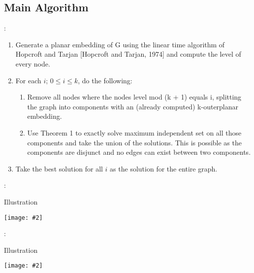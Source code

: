 \documentclass{beamer}
\newcommand{\iph}[2]{
    \texttt{[image: \#2]}
}
\begin{document}
\subsection{Main Algorithm}
\begin{frame}{\secname : \subsecname}
    \begin{enumerate}
        \item Generate a planar embedding of G using the linear time algorithm of Hopcroft and Tarjan [Hopcroft
        and Tarjan, 1974] and compute the level of every
        node.
        \item For each $i$; $0 \leq i \leq k$, do the following:
        \begin{enumerate}
        \item Remove all nodes where the nodes level
        mod (k + 1) equals i, splitting the graph into
        components with an (already computed) k-outerplanar embedding.
        \item Use Theorem 1 to exactly solve maximum independent set on all those components and
        take the union of the solutions. This is possible as the components are disjunct and no
        edges can exist between two components.
        \end{enumerate}
        \item Take the best solution for all $i$ as the solution for
        the entire graph.
    \end{enumerate}
\end{frame}



\begin{frame}{\secname : \subsecname}
    \begin{block}{Illustration}    
        \iph{0.8}{mod1}
    \end{block}
\end{frame}

\begin{frame}{\secname : \subsecname}
    \begin{block}{Illustration}    
        \iph{0.8}{mod2}
    \end{block}
\end{frame}
\end{document}
